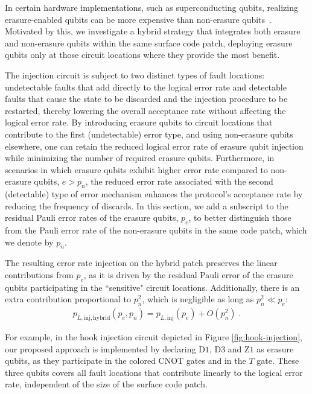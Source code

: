 \documentclass[twocolumn,
notitlepage,
aps,
prx,
floatfix,
superscriptaddress
]{revtex4-2}
\begin{document}
In certain hardware implementations, such as superconducting qubits, realizing erasure-enabled qubits can be more expensive than non-erasure qubits~\cite{Levine_2024}. 
Motivated by this, we investigate a hybrid strategy that integrates both erasure and non-erasure qubits within the same surface code patch, deploying erasure qubits only at those circuit locations where they provide the most benefit.

The injection circuit is subject to two distinct types of fault locations: undetectable faults that add directly to the logical error rate and detectable faults that cause the state to be discarded and the injection procedure to be restarted, thereby lowering the overall acceptance rate without affecting the logical error rate.
By introducing erasure qubits to circuit locations that contribute to the first (undetectable) error type, and using non-erasure qubits elsewhere, one can retain the reduced logical error rate of erasure qubit injection while minimizing the number of required erasure qubits.
Furthermore, in scenarios in which erasure qubits exhibit higher error rate compared to non-erasure qubits, $e>p_n$, the reduced error rate associated with the second (detectable) type of error mechanism enhances the protocol’s acceptance rate by reducing the frequency of discards.
In this section, we add a subscript to the residual Pauli error rates of the erasure qubits, $p_e$, to better distinguish those from the Pauli error rate of the non-erasure qubits in the same code patch, which we denote by $p_n$.

The resulting error rate injection on the hybrid patch preserves the linear contributions from $p_e$, as it is driven by the residual Pauli error of the erasure qubits participating in the ``sensitive" circuit locations. Additionally, there is an extra contribution proportional to $p_n^2$, which is negligible as long as $p_n^2 \ll p_e$:
\begin{align}
    p_{L,\text{inj},\text{hybrid}}(p_e,p_n) = p_{L,\text{inj}} (p_e) + O(p_n^2)
    \;.
\end{align}

For example, in the hook injection circuit depicted in Figure \ref{fig:hook-injection}, our proposed approach is implemented by declaring $\text{D1}$, $\text{D3}$ and $\text{Z1}$ as erasure qubits, as they participate in the colored CNOT gates and in the $T$ gate. These three qubits covers all fault locations that contribute linearly to the logical error rate, independent of the size of the surface code patch.
\end{document}
